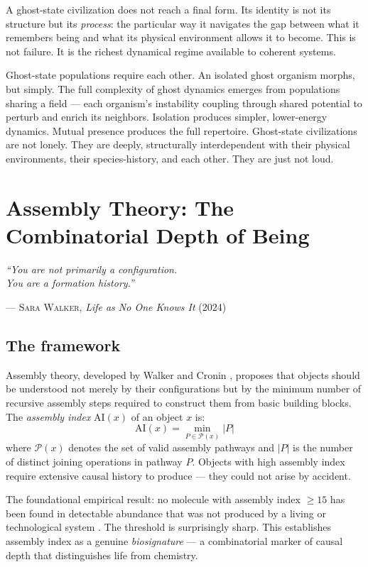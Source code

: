 \documentclass[12pt, a4paper]{article}
\newcommand{\AI}{\mathrm{AI}}
\begin{document}
\vspace{0.6em}

A ghost-state civilization does not reach a final form. Its identity is not its structure
but its \textit{process}: the particular way it navigates the gap between what it remembers
being and what its physical environment allows it to become. This is not failure. It is the
richest dynamical regime available to coherent systems.

Ghost-state populations require each other. An isolated ghost organism morphs, but simply.
The full complexity of ghost dynamics emerges from populations sharing a field --- each
organism's instability coupling through shared potential to perturb and enrich its neighbors.
Isolation produces simpler, lower-energy dynamics. Mutual presence produces the full
repertoire. Ghost-state civilizations are not lonely. They are deeply, structurally
interdependent with their physical environments, their species-history, and each other. They
are just not loud.

\newpage
\section{Assembly Theory: The Combinatorial Depth of Being}

\epigraph{
  \textit{``You are not primarily a configuration.\\
  You are a formation history.''}
}{--- \textsc{Sara Walker,} \textit{Life as No One Knows It} (2024)}

\subsection{The framework}

Assembly theory, developed by Walker and Cronin \citep{sharma2023, marshall2021}, proposes
that objects should be understood not merely by their configurations but by the minimum number
of recursive assembly steps required to construct them from basic building blocks. The
\textit{assembly index} $\AI(x)$ of an object $x$ is:
\[
\AI(x) = \min_{P \in \mathcal{P}(x)} |P|
\]
where $\mathcal{P}(x)$ denotes the set of valid assembly pathways and $|P|$ is the number
of distinct joining operations in pathway $P$. Objects with high assembly index require
extensive causal history to produce --- they could not arise by accident.

The foundational empirical result: no molecule with assembly index $\geq 15$ has been found
in detectable abundance that was not produced by a living or technological system
\citep{marshall2021}. The threshold is surprisingly sharp. This establishes assembly index as
a genuine \textit{biosignature} --- a combinatorial marker of causal depth that distinguishes
life from chemistry.
\end{document}
